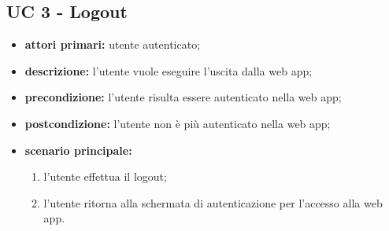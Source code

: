 		\subsection{UC 3 - Logout}
		\begin{itemize}
			\item \textbf{attori primari:} utente autenticato;
			\item \textbf{descrizione:} l'utente vuole eseguire l'uscita dalla web app;
			\item \textbf{precondizione:} l'utente risulta essere autenticato nella web app;
			\item \textbf{postcondizione:} l'utente non è più autenticato nella web app;
			\item \textbf{scenario principale:}
			\begin{enumerate}
				\item l'utente effettua il logout;
				\item l'utente ritorna alla schermata di autenticazione per l'accesso alla web app.
			\end{enumerate}
		\end{itemize}


		


		



		


		



		


